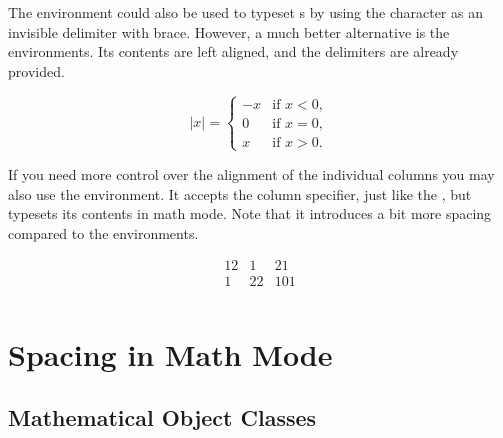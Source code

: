 The  environment could also be used to typeset s by using the  character as an invisible 
delimiter with brace. However, a much better alternative is the 
environments. Its contents are left aligned, and the delimiters are already
provided.
\begin{example}
\[
  \lvert x \rvert = 
  \begin{cases}
    -x & \text{if } x < 0, \\
    0  & \text{if } x = 0, \\
    x  & \text{if } x > 0.
  \end{cases} 
\]
\end{example}

If you need more control over the alignment of the individual columns you may
also use the  environment. It accepts the column specifier, just like
the , but typesets its contents in math mode. Note that it
introduces a bit more spacing compared to the  environments.
\begin{example}
\[
  \begin{array}{rcl}
    12 & 1 & 21 \\
    1 & 22 & 101 \\
  \end{array}
\]
\end{example}

\section{Spacing in Math Mode}\label{sec:math-spacing}%

\subsection{Mathematical Object Classes}

